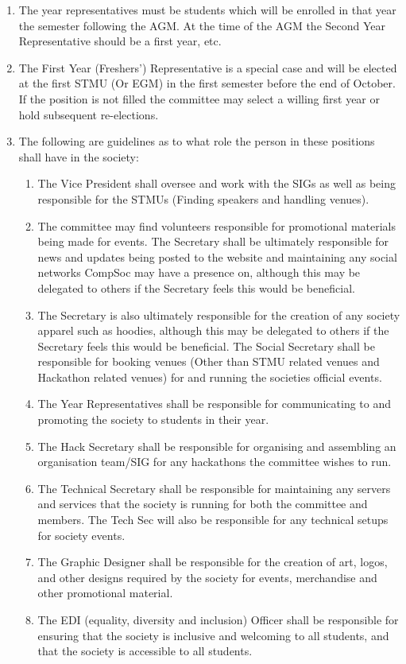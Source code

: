 \begin{enumerate}
\item The year representatives must be students which will be enrolled in that year the semester following the AGM\@. At the time of the AGM the Second Year Representative should be a first year, etc.

\item The First Year (Freshers') Representative is a special case and will be elected at the first STMU (Or EGM) in the first semester before the end of October. If the position is not filled the committee may select a willing first year or hold subsequent re-elections.

\item The following are guidelines as to what role the person in these positions shall have in the society:
  \begin{enumerate}
  \item The Vice President shall oversee and work with the SIGs as well as being responsible for the STMUs (Finding speakers and handling venues).
  \item The committee may find volunteers responsible for promotional materials being made for events. The Secretary shall be ultimately responsible for news and updates being posted to the website and maintaining any social networks CompSoc may have a presence on, although this may be delegated to others if the Secretary feels this would be beneficial.
  \item The Secretary is also ultimately responsible for the creation of any society apparel such as hoodies, although this may be delegated to others if the Secretary feels this would be beneficial. The Social Secretary shall be responsible for booking venues (Other than STMU related venues and Hackathon related venues) for and running the societies official events.
  \item The Year Representatives shall be responsible for communicating to and promoting the society to students in their year.
  \item The Hack Secretary shall be responsible for organising and assembling an organisation team/SIG for any hackathons the committee wishes to run.
  \item The Technical Secretary shall be responsible for maintaining any servers and services that the society is running for both the committee and members. The Tech Sec will also be responsible for any technical setups for society events.
  \item The Graphic Designer shall be responsible for the creation of art, logos, and other designs required by the society for events, merchandise and other promotional material.
  \item The EDI (equality, diversity and inclusion) Officer shall be responsible for ensuring that the society is inclusive and welcoming to all students, and that the society is accessible to all students.
  \end{enumerate}


\end{enumerate}
